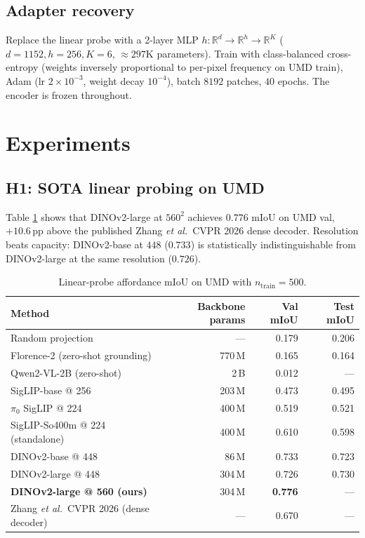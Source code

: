 \documentclass[10pt]{article}
\begin{document}
\subsection{Adapter recovery}

Replace the linear probe with a 2-layer MLP $h: \mathbb{R}^d \to
\mathbb{R}^h \to \mathbb{R}^K$ ($d = 1152, h = 256, K = 6$, $\approx 297$K
parameters). Train with class-balanced cross-entropy (weights inversely
proportional to per-pixel frequency on UMD train), Adam (lr $2 \times
10^{-3}$, weight decay $10^{-4}$), batch $8192$ patches, $40$ epochs. The
encoder is frozen throughout.

\section{Experiments}

\subsection{H1: SOTA linear probing on UMD}

Table \ref{tab:h1_probing} shows that DINOv2-large at $560^2$ achieves
$0.776$ mIoU on UMD val, $+10.6$\,pp above the published Zhang
\emph{et al.}\ CVPR 2026 dense decoder. Resolution beats capacity: DINOv2-base at
$448$ ($0.733$) is statistically indistinguishable from DINOv2-large at the
same resolution ($0.726$).

\begin{table}[ht]
\centering
\small
\begin{tabular}{lrrr}
\toprule
Method & Backbone params & Val mIoU & Test mIoU \\
\midrule
Random projection & --- & 0.179 & 0.206 \\
Florence-2 (zero-shot grounding) & 770\,M & 0.165 & 0.164 \\
Qwen2-VL-2B (zero-shot) & 2\,B & 0.012 & --- \\
SigLIP-base @ 256 & 203\,M & 0.473 & 0.495 \\
$\pi_0$ SigLIP @ 224 & 400\,M & 0.519 & 0.521 \\
SigLIP-So400m @ 224 (standalone) & 400\,M & 0.610 & 0.598 \\
DINOv2-base @ 448 & 86\,M & 0.733 & 0.723 \\
DINOv2-large @ 448 & 304\,M & 0.726 & 0.730 \\
\textbf{DINOv2-large @ 560 (ours)} & 304\,M & \textbf{0.776} & --- \\
\midrule
Zhang \emph{et al.}\ CVPR 2026 (dense decoder) & --- & 0.670 & --- \\
\bottomrule
\end{tabular}
\caption{Linear-probe affordance mIoU on UMD with $n_{\mathrm{train}} = 500$.}
\label{tab:h1_probing}
\end{table}
\end{document}
